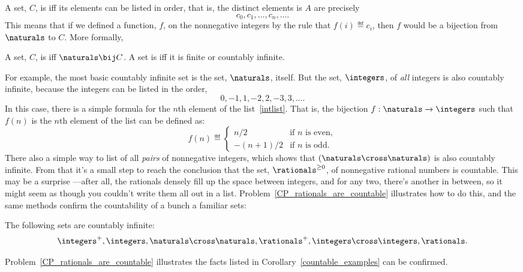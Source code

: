 A set, $C$, is  iff its elements can be listed in order,
that is, the distinct elements is $A$ are precisely
\[
c_0, c_1, \dots, c_n, \dots.
\]
This means that if we defined a function, $f$, on the nonnegative integers
by the rule that $f(i) \eqdef c_i$, then $f$ would be a bijection from
$\naturals$ to $C$.  More formally,

\begin{definition}
  A set, $C$, is  iff $\naturals \bij C$.  A set
  is  iff it is finite or countably infinite.
\end{definition}

For example, the most basic countably infinite set is the set,
$\naturals$, itself.  But the set, $\integers$, of \emph{all} integers is
also countably infinite, because the integers can be listed in the order,
\begin{equation}\label{intlist}
0,-1,1,-2,2,-3,3,\dots.
\end{equation}
In this case, there is a simple formula for the $n$th element of the
list~\eqref{intlist}.  That is, the bijection $f:\naturals \to
\integers$ such that $f(n)$ is the $n$th element of the list can be defined as:
\[
f(n) \eqdef \begin{cases}
            n/2 & \text{if $n$ is even},\\
            -(n+1)/2 & \text{if $n$ is odd}.
           \end{cases} 
\]    
There also a simple way to list of all \emph{pairs} of nonnegative
integers, which shows that $(\naturals \cross \naturals)$ is also
countably infinite.  From that it's a small step to reach the
conclusion that the set, $\rationals^{\ge 0}$, of nonnegative rational
numbers is countable.  This may be a surprise ---after all, the
rationals densely fill up the space between integers, and for any two,
there's another in between, so it might seem as though you couldn't
write them all out in a list.
Problem~\ref{CP_rationals_are_countable} illustrates how to do this,
and the same methods confirm the countability of a bunch a familiar
sets:

\begin{corollary}\label{countable_examples}
The following sets are countably infinite:
\[\integers^+, 
 \integers,
 \naturals \cross \naturals,
 \rationals^+,
 \integers \cross \integers,
 \rationals.
\]
\end{corollary}
Problem~\ref{CP_rationals_are_countable} illustrates the facts listed in
Corollary~\ref{countable_examples} can be confirmed.

